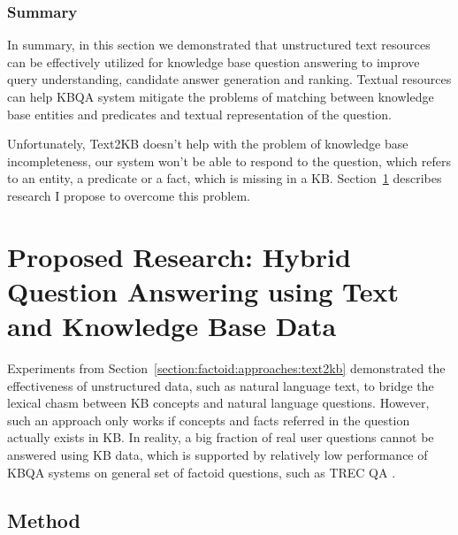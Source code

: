 \subsubsection{Summary}
\label{section:factoid:approaches:text2kb:summary}

In summary, in this section we demonstrated that unstructured text resources can be effectively utilized for knowledge base question answering to improve query understanding, candidate answer generation and ranking.
Textual resources can help KBQA system mitigate the problems of matching between knowledge base entities and predicates and textual representation of the question.

Unfortunately, Text2KB doesn't help with the problem of knowledge base incompleteness, \ie our system won't be able to respond to the question, which refers to an entity, a predicate or a fact, which is missing in a KB.
Section~\ref{section:factoid:proposal} describes research I propose to overcome this problem.


\section{Proposed Research: Hybrid Question Answering using Text and Knowledge Base Data}
\label{section:factoid:proposal}

Experiments from Section~\ref{section:factoid:approaches:text2kb} demonstrated the effectiveness of unstructured data, such as natural language text, to bridge the lexical chasm between KB concepts and natural language questions.
However, such an approach only works if concepts and facts referred in the question actually exists in KB.
In reality, a big fraction of real user questions cannot be answered using KB data, which is supported by relatively low performance of KBQA systems on general set of factoid questions, such as TREC QA \cite{Sun:2015:ODQ:2736277.2741651}.



\subsection{Method}
\label{section:factoid:proposal:method}

